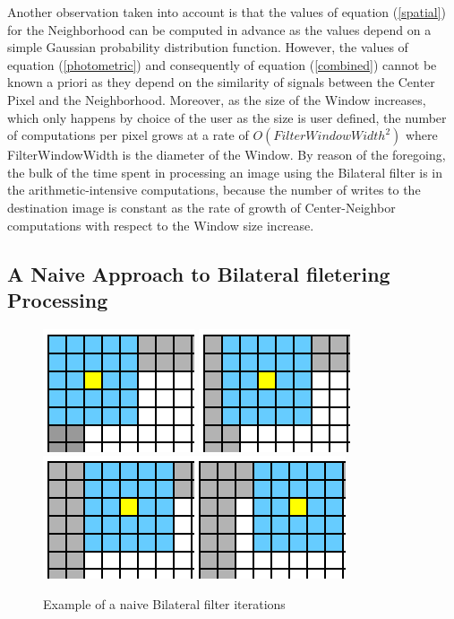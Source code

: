 \documentclass{IEEEtran}
\begin{document}
Another observation taken into account is that the values of equation (\ref{spatial}) for the Neighborhood can be computed in advance as the values depend on a simple Gaussian probability distribution function. However, the values of equation (\ref{photometric}) and consequently of equation (\ref{combined}) cannot be known a priori as they depend on the similarity of signals between the Center Pixel and the Neighborhood. Moreover, as the size of the Window increases, which only happens by choice of the user as the size is user defined, the number of computations per pixel grows at a rate of $O(FilterWindowWidth^{2})$ where FilterWindowWidth is the diameter of the Window. By reason of the foregoing, the bulk of the time spent in processing an image using the Bilateral filter is in the arithmetic-intensive computations, because the number of writes to the destination image is constant as the rate of growth of Center-Neighbor computations with respect to the Window size increase.

\subsection{A Naive Approach to Bilateral filetering Processing}

\begin{figure}
\centering\includegraphics[scale=0.35]{images/the1}
\includegraphics[clip,scale=0.35]{images/the202}\includegraphics[scale=0.35]{images/the2}\includegraphics[scale=0.35]{images/the3}
\caption{Example of a naive Bilateral filter iterations}
\end{figure}
\end{document}
